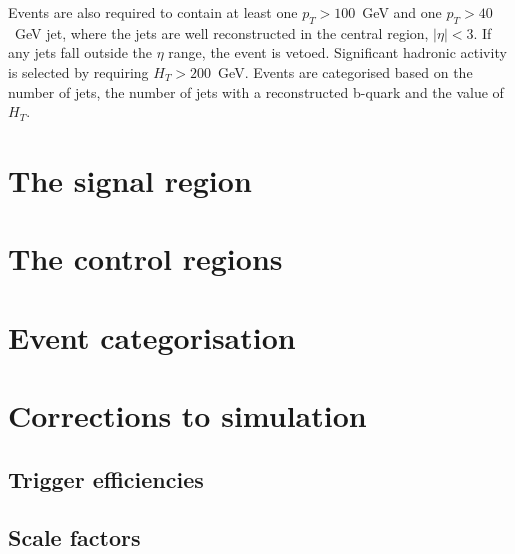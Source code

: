 Events are also required to contain at least one $p_T>100$~GeV and one
$p_T>40$~GeV jet, where the jets are well reconstructed in the central
region, $|\eta|<3$. If any jets fall outside the $\eta$ range, the
event is vetoed. Significant hadronic activity is selected by
requiring $H_T>200$~GeV. Events are categorised based on the number of
jets, the number of jets with a reconstructed b-quark and the value of
$H_T$. 

\section{The signal region}
\label{sec:signalregion}


\section{The control regions}
\label{sec:controlregions}


\section{Event categorisation}


\section{Corrections to simulation} %



\subsection{Trigger efficiencies}


\subsection{Scale factors}


